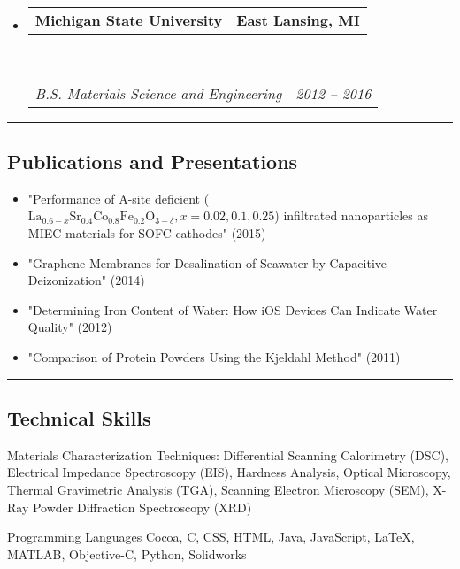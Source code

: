 \documentclass[10pt,letterpaper]{article}
\makeatletter
\newenvironment{indentsection}[1]%
{\begin{list}{}%
  {\setlength{\leftmargin}{#1}}%
  \item[]%
}
{\end{list}}
\newcommand{\headerrow}[2]
{\begin{tabular*}{\linewidth}{l@{\extracolsep{\fill}}r}
  #1 &
  #2 \\
\end{tabular*}}
\newcommand{\CPP}
{C\nolinebreak[4]\hspace{-.05em}\raisebox{.22ex}{\footnotesize\bf ++}}
\makeatother
\begin{document}
\begin{itemize}
  \parskip=0.1em

  \item 
  \headerrow
    {\textbf{Michigan State University}}
    {\textbf{East Lansing, MI}}
  \\
  \headerrow
    {\emph{B.S. Materials Science and Engineering}}
    {\emph{2012 -- 2016}}

\end{itemize}


\hrule
\vspace{-0.6em}
\subsection*{Publications and Presentations}  

\begin{itemize}
  \parskip=0.1em

  \item "Performance of A-site deficient ($\text{La}_{0.6-x}\text{Sr}_{0.4}\text{Co}_{0.8}\text{Fe}_{0.2}\text{O}_{3-\delta}, x = 0.02, 0.1, 0.25$) infiltrated nanoparticles as MIEC materials for SOFC cathodes" (2015)
  \item "Graphene Membranes for Desalination of Seawater by Capacitive Deizonization" (2014)
  \item "Determining Iron Content of Water: How iOS Devices Can Indicate Water Quality" (2012)
  \item "Comparison of Protein Powders Using the Kjeldahl Method" (2011)
\end{itemize}


\hrule
\vspace{-0.6em}
\subsection*{Technical Skills}

\begin{indentsection}{\parindent}
\begin{description*}
  \item[Materials Characterization Techniques:]
  Differential Scanning Calorimetry (DSC), Electrical Impedance Spectroscopy (EIS), Hardness Analysis, Optical Microscopy, Thermal Gravimetric Analysis (TGA), Scanning Electron Microscopy (SEM), X-Ray Powder Diffraction Spectroscopy (XRD)
  \item[Programming Languages]
  Cocoa, \CPP, CSS, HTML, Java, JavaScript, \LaTeX, MATLAB, Objective-C, Python, Solidworks

\end{description*}
\end{indentsection}
\end{document}
